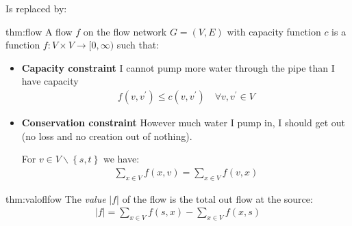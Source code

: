 \par\bigskip
\noindent Is replaced by:
\begin{figure}[ht!]
    \centering
    \caption{}
\end{figure}
\newpage
\begin{theo}{thm:flow}
  A flow $f$ on the flow network $G = (V,E)$ with capacity function $c$ is a function $f:V\times V\to [0,\infty)$ such that:\par
  \begin{itemize}
    \item\textbf{Capacity constraint} I cannot pump more water through the pipe than I have capacity
      \begin{equation*}
        \begin{gathered}
          f(v,v^{\prime})\leq c(v,v^{\prime})\quad\forall v,v^{\prime}\in V
        \end{gathered}
      \end{equation*}
      \par\bigskip
    \item\textbf{Conservation constraint} However much water I pump in, I should get out (no loss and no creation out of nothing).
      \par\bigskip
    \noindent For $v\in V\backslash\left\{s,t\right\}$ we have:
    \begin{equation*}
      \begin{gathered}
        \sum_{x\in V}f(x,v) = \sum_{x\in V}f(v,x)
      \end{gathered}
    \end{equation*}
  \end{itemize}
  \par\bigskip
\end{theo}
\par\bigskip
\begin{theo}{thm:valoflfow}
  The \textit{value} $\left|f\right|$ of the flow is the total out flow at the source:
  \begin{equation*}
    \begin{gathered}
      \left|f\right| = \sum_{x\in V}f(s,x)-\sum_{x\in V}f(x,s)
    \end{gathered}
  \end{equation*}
\end{theo}
